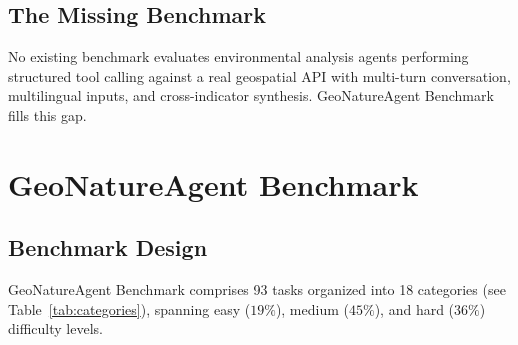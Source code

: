 \documentclass[sigconf]{acmart}
\begin{document}
\subsection{The Missing Benchmark}

No existing benchmark evaluates environmental analysis agents performing structured tool calling against a real geospatial API with multi-turn conversation, multilingual inputs, and cross-indicator synthesis. GeoNatureAgent Benchmark fills this gap.



\section{GeoNatureAgent Benchmark}
\label{sec:benchmark}


\subsection{Benchmark Design}

GeoNatureAgent Benchmark comprises 93 tasks organized into 18 categories (see Table~\ref{tab:categories}), spanning easy ($19\%$), medium ($45\%$), and hard ($36\%$) difficulty levels.
\end{document}
